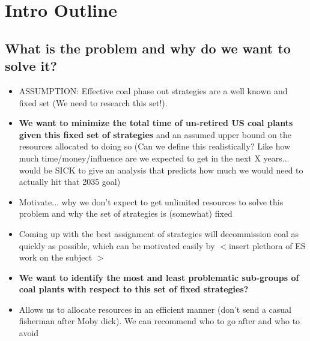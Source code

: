 \section{Intro Outline}


\subsection{What is the problem and why do we want to solve it?}
\begin{itemize}
    \item ASSUMPTION: Effective coal phase out strategies are a well known and fixed set (We need to research this set!).  
    \item \textbf{We want to minimize the total time of un-retired US coal plants given this fixed set of strategies} and an assumed upper bound on the resources allocated to doing so (Can we define this realistically? Like how much time/money/influence are we expected to get in the next X years... would be SICK to give an analysis that predicts how much we would need to actually hit that 2035 goal) 
    \item Motivate... why we don't expect to get unlimited resources to solve this problem and why the set of strategies is (somewhat) fixed 
    \item Coming up with the best assignment of strategies will decommission coal as quickly as possible, which can be motivated easily by $<$insert plethora of ES work on the subject $>$
    \item \textbf{We want to identify the most and least problematic sub-groups of coal plants with respect to this set of fixed strategies?}
    \item Allows us to allocate resources in an efficient manner (don't send a casual fisherman after Moby dick). We can recommend who to go after and who to avoid 
\end{itemize}


